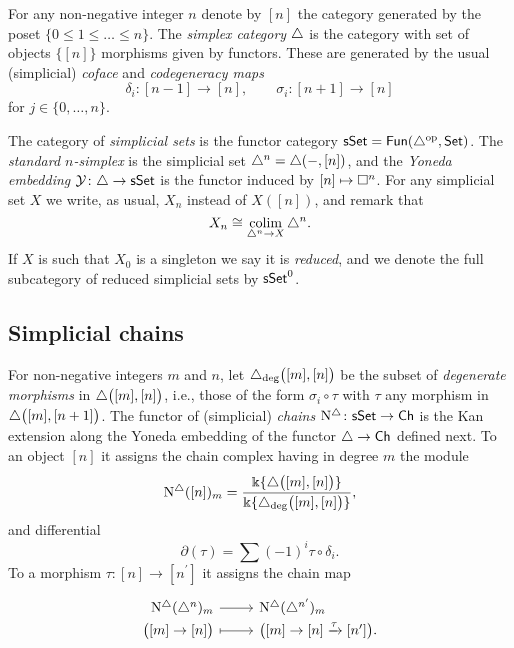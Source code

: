 For any non-negative integer $n$ denote by $[n]$ the category generated by the poset $\{0 \leq 1 \leq \dots \leq n\}$.
The \textit{simplex category} $\triangle$ is the category with set of objects $\big\{ [n] \big\}$ morphisms given by functors.
These are generated by the usual (simplicial) \textit{coface} and \textit{codegeneracy maps}
\begin{equation*}
\delta_i \colon [n-1] \to [n], \qquad \sigma_i \colon [n+1] \to [n]
\end{equation*}
for $j \in \{0, \dots, n\}$.

The category of \textit{simplicial sets} is the functor category $\mathsf{sSet} = \mathsf{Fun}(\triangle^{\mathrm{op}}, \mathsf{Set})$.
The \textit{standard $n$-simplex} is the simplicial set $\triangle^n = \triangle(-, [n])$, and the \textit{Yoneda embedding} $\operatorname{\mathcal{Y}} \colon \triangle \to \mathsf{sSet}$ is the functor induced by $[n] \mapsto \square^n$.
For any simplicial set $X$ we write, as usual, $X_n$ instead of $X([n])$, and remark that
\begin{equation*}
X_n \cong \operatorname*{colim}_{\triangle^n \to X} \triangle^n.
\end{equation*}
If $X$ is such that $X_0$ is a singleton we say it is \textit{reduced}, and we denote the full subcategory of reduced simplicial sets by $\mathsf{sSet}^0$.

\subsection{Simplicial chains} \label{ss:simplicial sets}

For non-negative integers $m$ and $n$, let $\triangle_{\deg} \big( [m], [n] \big)$ be the subset of \textit{degenerate morphisms} in $\triangle \big( [m], [n] \big)$, i.e., those of the form $\sigma_i \circ \tau$ with $\tau$ any morphism in $\triangle \big( [m], [n+1] \big)$.
The functor of (simplicial) \textit{chains} $\operatorname{N^{\triangle}} \colon \mathsf{sSet} \to \mathsf{Ch}$ is the Kan extension along the Yoneda embedding of the functor $\triangle \to \mathsf{Ch}$ defined next.
To an object $[n]$ it assigns the chain complex having in degree $m$ the module
\begin{equation*}
\operatorname{N^{\triangle}}([n])_m = \frac{\Bbbk\{\triangle \big( [m], [n] \big) \}}{\Bbbk\{\triangle_{\deg} \big( [m], [n] \big) \}},
\end{equation*}
and differential
\begin{equation*}
\partial(\tau) = \sum (-1)^i \tau \circ \delta_i.
\end{equation*}
To a morphism $\tau \colon [n] \to [n^\prime]$ it assigns the chain map
\begin{equation*}
\begin{tikzcd}[row sep=-3pt, column sep=normal,
/tikz/column 1/.append style={anchor=base east},
/tikz/column 2/.append style={anchor=base west}]
\schains(\simplex^n)_m \arrow[r] &  \schains(\simplex^{n^\prime})_m \\
\big( [m] \to [n] \big) \arrow[r, mapsto] & \big( [m] \to [n] \xra{\tau} [n^\prime] \big).
\end{tikzcd}
\end{equation*}

